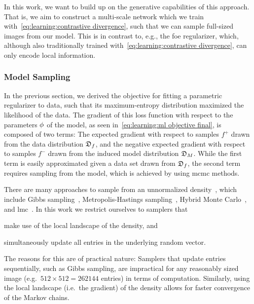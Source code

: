 \documentclass[../ml-ct.tex]{subfiles}
\begin{document}
In this work, we want to build up on the generative capabilities of this approach.
That is, we aim to construct a multi-scale network which we train with~\cref{eq:learning:contrastive divergence}, such that we can sample full-sized images from our model.
This is in contrast to, e.g., the \gls{foe} regularizer, which, although also traditionally trained with~\cref{eq:learning:contrastive divergence}, can only encode local information.
\subsubsection{Model Sampling}
In the previous section, we derived the objective for fitting a parametric regularizer to data, such that its maximum-entropy distribution maximized the likelihood of the data.
The gradient of this loss function with respect to the parameters \( \phi \) of the model, as seen in~\cref{eq:learning:ml objective final}, is composed of two terms:
The expected gradient with respect to samples \( f^+ \) drawn from the data distribution \( \mathfrak{D}_{f} \), and the negative expected gradient with respect to samples \( f^- \) drawn from the induced model distribution \( \mathfrak{D}_{M} \).
While the first term is easily approximated given a data set drawn from \( \mathfrak{D}_{f} \), the second term requires sampling from the model, which is achieved by using \gls{mcmc} methods.

There are many approaches to sample from an unnormalized density~\cite[Chapter~11]{brooks_handbook_2011,bishop_pattern_2006}, which include Gibbs sampling~\cite{geman_stochastic_1984}, Metropolis-Hastings sampling~\cite{hastings_monte_1970}, Hybrid Monte Carlo~\cite{douane_hybrid_1987}, and \gls{lmc}~\cite{roberts_optimal_1998}.
In this work we restrict ourselves to samplers that
\begin{enumerate*}
	\item make use of the local landscape of the density, and
	\item simultaneously update all entries in the underlying random vector.
\end{enumerate*}
The reasons for this are of practical nature:
Samplers that update entries sequentially, such as Gibbs sampling, are impractical for any reasonably sized image (e.g.\ \( \num{512} \times \num{512} = \num{262144} \) entries) in terms of computation.
Similarly, using the local landscape (i.e.\ the gradient) of the density allows for faster convergence of the Markov chains.
\end{document}
